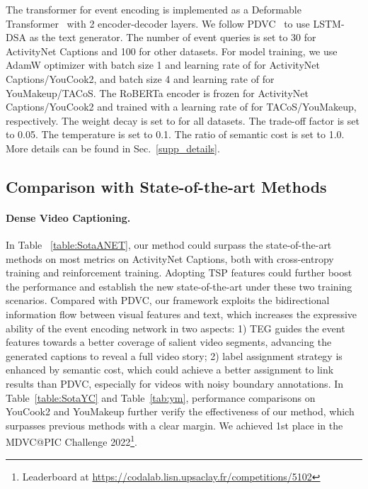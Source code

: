 The transformer for event encoding is implemented as a Deformable Transformer~\cite{zhu2020deformable} with 2 encoder-decoder layers. We follow PDVC~\cite{wang2021end} to use LSTM-DSA as the text generator. The number of event queries  is set to 30 for ActivityNet Captions and 100 for other datasets. For model training, we use AdamW optimizer with batch size 1 and learning rate of  for ActivityNet Captions/YouCook2, and batch size 4 and learning rate of  for YouMakeup/TACoS. The RoBERTa encoder is frozen for ActivityNet Captions/YouCook2 and trained with a learning rate of  for TACoS/YouMakeup, respectively. The weight decay is set to  for all datasets. The trade-off factor  is set to 0.05. The temperature  is set to 0.1. The ratio of semantic cost  is set to 1.0. More details can be found in Sec.~\ref{supp_details}.  

\subsection{Comparison with State-of-the-art Methods}

\paragraph{\textbf{Dense Video Captioning.}} In Table ~\ref{table:SotaANET}, our method could surpass the state-of-the-art methods on most metrics on ActivityNet Captions, both with cross-entropy training and reinforcement training. Adopting TSP features could further boost the performance and establish the new state-of-the-art under these two training scenarios. Compared with PDVC, our framework exploits the bidirectional information flow between visual features and text, which increases the expressive ability of the event encoding network in two aspects: 1) TEG guides the event features towards a better coverage of salient video segments, advancing the generated captions to reveal a full video story; 2) label assignment strategy is enhanced by semantic cost, which could achieve a better assignment to link results than PDVC, especially for videos with noisy boundary annotations. In Table~\ref{table:SotaYC} and Table~\ref{tab:ym}, performance comparisons on YouCook2 and YouMakeup further verify the effectiveness of our method, which surpasses previous methods with a clear margin. We achieved 1st place in the MDVC@PIC Challenge 2022\footnote{Leaderboard at \url{https://codalab.lisn.upsaclay.fr/competitions/5102}}. 
\vspace{-1.0em}
